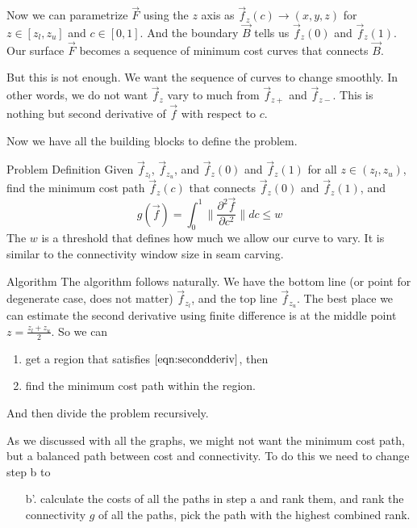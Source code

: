 \documentclass[12pt,a4paper,hidelinks]{article}            %
\begin{document}
Now we can parametrize $\vec{F}$ using the $z$ axis as $\vec{f}_z(c) \rightarrow (x, y, z)$ for $z \in [z_l, z_u]$ and $c\in[0, 1]$.
And the boundary $\vec{B}$ tells us $\vec{f}_z(0)$ and $\vec{f}_z(1)$. 
Our surface $\vec{F}$ becomes a sequence of minimum cost curves that connects $\vec{B}$.

But this is not enough. We want the sequence of curves to change smoothly.
In other words, we do not want $\vec{f}_z$ vary to much from $\vec{f}_{z+}$ and $\vec{f}_{z-}$.
This is nothing but second derivative of $\vec{f}$ with respect to $c$.

Now we have all the building blocks to define the problem.
\begin{concept}{Problem Definition}
Given $\vec{f}_{z_l}$, $\vec{f}_{z_u}$, and $\vec{f}_z(0)$ and $\vec{f}_z(1)$ for all $z \in (z_l, z_u)$, find the minimum cost path 
$\vec{f}_z(c)$ that connects $\vec{f}_z(0)$ and $\vec{f}_z(1)$, and 
\begin{equation}
g(\vec{f}) = \int_0^1\|\frac{\partial^2 \vec{f}}{\partial c^2}\| dc \leq w
\label{eqn:secondderiv}
\end{equation}
The $w$ is a threshold that defines how much we allow our curve to vary. It is similar to the connectivity window size in seam carving.
\end{concept}

\begin{concept}{Algorithm}
The algorithm follows naturally. We have the bottom line (or point for degenerate case, does not matter)
$\vec{f}_{z_l}$, and the top line $\vec{f}_{z_u}$. 
The best place we can estimate the second derivative using finite difference is at the middle point $\displaystyle z = \frac{z_l + z_u}{2}$.
So we can 
\begin{enumerate}
\item get a region that satisfies $\eqref{eqn:secondderiv}$, then
\item find the minimum cost path within the region.
\end{enumerate}
And then divide the problem recursively.

\vspace{5mm}
As we discussed with all the graphs, we might not want the minimum cost path,
but a balanced path between cost and connectivity.
To do this we need to change step b to
\begin{enumerate}
\item[b'.] calculate the costs of all the paths in step a and rank them, and rank the connectivity $g$ of all the paths, pick the path with the highest combined rank.
\end{enumerate}
\end{concept}
\end{document}
